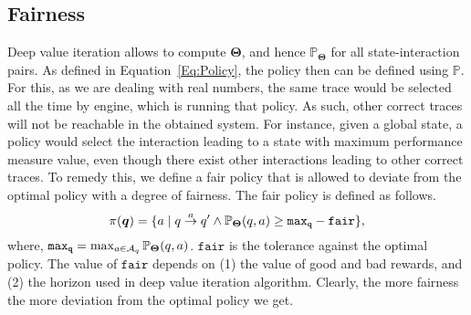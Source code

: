 \subsection{Fairness}
Deep value iteration allows to compute $\bm{\Theta}$, and hence $\mathbb{P}_{\bm{\Theta}}$ for all state-interaction pairs. As defined in Equation~\ref{Eq:Policy}, the policy then can be defined using $\mathbb{P}$. For this, as we are dealing with real numbers, the same trace would be selected all the time by engine, which is running that policy. As such, other correct traces will not be reachable in the obtained system. For instance, given a global state, a policy would select the interaction leading to a state with maximum performance measure value, even though there exist other interactions leading to other correct traces. To remedy this, we define a fair policy that is allowed to deviate from the optimal policy with a degree of fairness.  The fair policy is defined as follows. 
\begin{equation}
\label{Eq:Policy-fair}
\pi(\bm{q}) = \{a \mid q \goesto[a] q' \wedge \mathbb{P}_{\bm{\Theta}}(q, a) \geq \mathtt{max_q} - \mathtt{fair}\},
\end{equation}
where, $\mathtt{max_q} = \max_{a \in {\cal A}_q}\mathbb{P}_{\bm{\Theta}}(q, a)$.  $\mathtt{fair}$ is the tolerance against the optimal policy. The value of $\mathtt{fair}$ depends on (1) the value of good and bad rewards, and (2) the  horizon used in deep value iteration algorithm. Clearly, the more fairness the more deviation from the optimal policy we get. 
